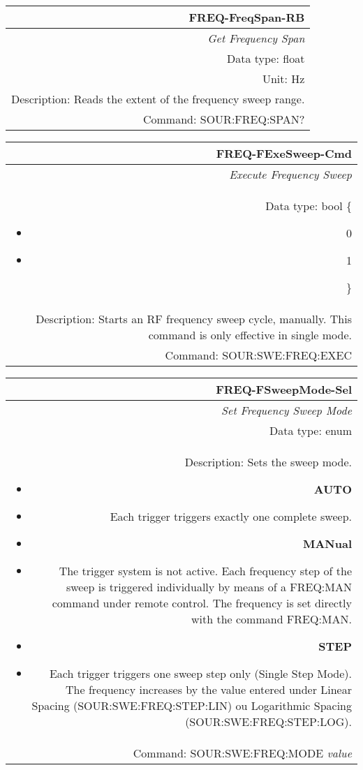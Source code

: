 \documentclass[openany]{article}
\begin{document}
		\begin{tabular}{N}
			\hline
			\bfseries FREQ-FreqSpan-RB \\ \hline
			\emph{Get Frequency Span} \\
			Data type: float \\
			Unit: Hz \\
			Description: Reads the extent of the frequency sweep range. \\
			Command: SOUR:FREQ:SPAN? \\

		\end{tabular}
%
		\begin{tabular}{N}
			\hline
			\bfseries FREQ-FExeSweep-Cmd \\ \hline
			\emph{Execute Frequency Sweep} \\
			Data type: bool \{\begin{itemize}[noitemsep]
				\small
				\item[] 0
				\item[] 1
			\end{itemize}\} \\
			Description: Starts an RF frequency sweep cycle, manually. This command is only effective in single mode. \\
			Command: SOUR:SWE:FREQ:EXEC \\

		\end{tabular}
%
		\begin{tabular}{N}
			\hline
			\bfseries FREQ-FSweepMode-Sel \\ \hline
			\emph{Set Frequency Sweep Mode} \\
			Data type: enum \\
			Description: Sets the sweep mode.\begin{itemize}[noitemsep]
				\small
				\item[] \textbf{AUTO}
				\item[] Each trigger triggers exactly one complete sweep.
				\item[] \textbf{MANual}
				\item[] The trigger system is not active. Each frequency step of the sweep is triggered individually by means of a FREQ:MAN command under remote control. The frequency is set directly with the command FREQ:MAN.
				\item[] \textbf{STEP}
				\item[] Each trigger triggers one sweep step only (Single Step Mode). The frequency increases by the value entered under Linear Spacing (SOUR:SWE:FREQ:STEP:LIN) ou Logarithmic Spacing (SOUR:SWE:FREQ:STEP:LOG).
			\end{itemize} \\
			Command: SOUR:SWE:FREQ:MODE \emph{value} \\

		\end{tabular}
\end{document}
